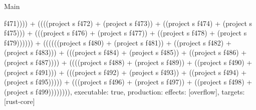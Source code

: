 \begin{lexlean}{Main}
\begin{semanticmodule}
{f471)))) + ((((project s f472) + (project s f473)) + ((project s f474) + (project s f475))) + (((project s f476) + (project s f477)) + ((project s f478) + (project s f479)))))) + ((((((project s f480) + (project s f481)) + ((project s f482) + (project s f483))) + (((project s f484) + (project s f485)) + ((project s f486) + (project s f487)))) + ((((project s f488) + (project s f489)) + ((project s f490) + (project s f491))) + (((project s f492) + (project s f493)) + ((project s f494) + (project s f495))))) + (((project s f496) + (project s f497)) + ((project s f498) + (project s f499)))))))),
  executable: true,
  production: {effects: [overflow], targets: [rust-core]}
}
\end{semanticmodule}
\end{lexlean}
